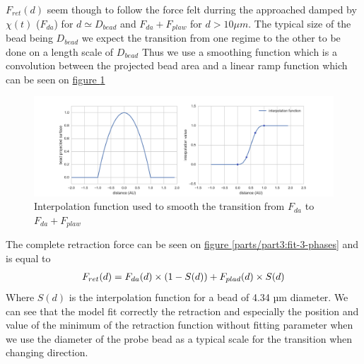 \documentclass[A4paperpaper,11pt,english]{sphinxmanual}
\begin{document}
\(F_{ret}(d)\) seem though to follow the force felt durring the approached damped by \(\chi(t)\) (\(F_{da}\)) for \(d
\simeq{D_{bead}}\) and \(F_{da}+F_{plaw}\) for \(d > 10\mu{}m\).  The
typical size of the bead being \(D_{bead}\) we expect the transition from
one regime to the other to be done on a length scale of \(D_{bead}\) Thus
we use a smoothing function which is a convolution between the projected bead
area and a linear ramp function which can be seen on \hyperref[parts/part3:interp]{figure  \ref*{parts/part3:interp}}
\begin{figure}[htbp]
\centering
\capstart

\includegraphics[width=0.900\linewidth]{interpolation.png}
\caption{Interpolation function used to smooth the transition from \(F_{da}\) to
\(F_{da}+F_{plaw}\)}\label{parts/part3:interp}\end{figure}

The complete retraction force can be seen on \hyperref[parts/part3:fit-3-phases]{figure  \ref*{parts/part3:fit-3-phases}} and is equal to
\begin{gather}
\begin{split}F_{ret}(d) &= F_{da}(d)\times(1-S(d)) + F_{plad}(d)\times S(d)\\\end{split}\notag
\end{gather}
Where \(S(d)\) is the interpolation function for a bead of 4.34 µm
diameter. We can see that the model fit correctly the retraction and especially
the position and value of the minimum of the retraction function without
fitting parameter when we use the diameter of the probe bead as a typical scale
for the transition when changing direction.
\end{document}
